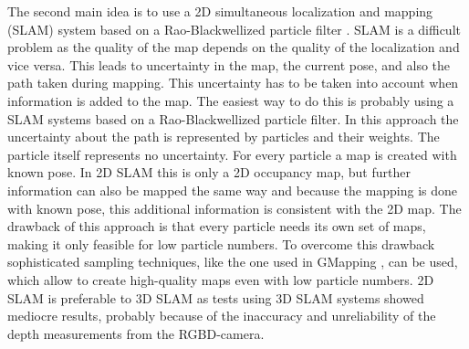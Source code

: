 The second main idea is to use a 2D simultaneous localization and mapping (SLAM) system based on a Rao-Blackwellized particle filter \cite{particle}. SLAM is a difficult problem as the quality of the map depends on the quality of the localization and vice versa. This leads to uncertainty in the map, the current pose, and also the path taken during mapping. This uncertainty has to be taken into account when information is added to the map. The easiest way to do this is probably using a SLAM systems based on a Rao-Blackwellized particle filter. In this approach the uncertainty about the path is represented by particles and their weights. The particle itself represents no uncertainty. For every particle a map is created with known pose. In 2D SLAM this is only a 2D occupancy map, but further information can also be mapped the same way and because the mapping is done with known pose, this additional information is consistent with the 2D map. The drawback of this approach is that every particle needs its own set of maps, making it only feasible for low particle numbers. To overcome this drawback sophisticated sampling techniques, like the one used in GMapping \cite{GMapping}, can be used, which allow to create high-quality maps even with low particle numbers. 2D SLAM is preferable to 3D SLAM as tests using 3D SLAM systems showed mediocre results, probably because of the inaccuracy and unreliability of the depth measurements from the RGBD-camera.

